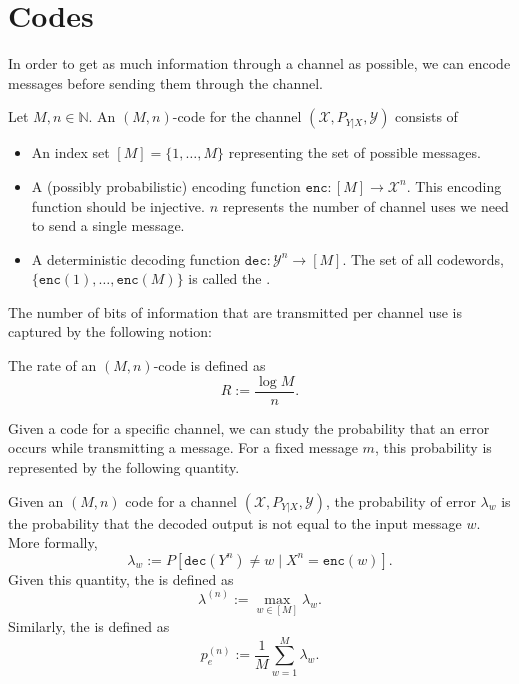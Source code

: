 \section{Codes}
In order to get as much information through a channel as possible, we can encode messages before sending them through the channel.

\begin{definition}[Code]\label{def:code}
Let $M, n \in \mathbb{N}$. An $(M,n)$-code for the channel $(\mathcal{X},P_{Y|X},\mathcal{Y})$ consists of
\begin{itemize}
\item An index set $[M] = \{1, \ldots, M\}$ representing the set of possible messages.
\item A (possibly probabilistic) encoding function $\mathtt{enc} :[M] \to \mathcal{X}^n$. This encoding function should be injective. $n$ represents the number of channel uses we need to send a single message.
\item A deterministic decoding function $\mathtt{dec} : \mathcal{Y}^n \to [M]$.
The set of all codewords, $\{\mathtt{enc}(1), \ldots, \mathtt{enc}(M)\}$ is called the .
\end{itemize}
\end{definition}

\noindent The number of bits of information that are transmitted per channel use is captured by the following notion:

\begin{definition}[Rate]
The rate of an $(M,n)$-code is defined as
\[
R := \frac{\log M}{n}.
\]
\end{definition}

Given a code for a specific channel, we can study the probability that an error occurs while transmitting a message. For a fixed message $m$, this probability is represented by the following quantity.

\begin{definition}\label{def:probability-of-error}
Given an $(M,n)$ code for a channel $(\mathcal{X},P_{Y|X},\mathcal{Y})$, the probability of error $\lambda_w$ is the probability that the decoded output is not equal to the input message $w$. More formally,
\[
\lambda_w := P[\mathtt{dec}(Y^n) \neq w \mid X^n = \mathtt{enc}(w)].
\]
Given this quantity, the  is defined as 
\[\lambda^{(n)} := \max_{w \in [M]} \lambda_w.\]
Similarly, the  is defined as
\[
p_e^{(n)} := \frac{1}{M} \sum_{w=1}^M \lambda_w.
\]
\end{definition}

